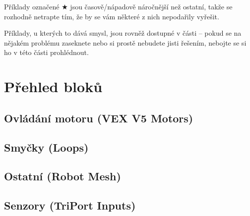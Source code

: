 Příklady označené $\bigstar$ jsou časově/nápadově náročnější než ostatní, takže se rozhodně netrapte tím, že by se vám některé z nich nepodařily vyřešit.

Příklady, u kterých to dává smysl, jsou rovněž dostupné v části  -- pokud se na nějakém problému zaseknete nebo si prostě nebudete jisti řešením, nebojte se si ho v této části prohlédnout.

\errata

\newpage

\setcounter{secnumdepth}{3}

\newpage

\newpage

\newpage

\newpage

\newpage

\newpage
\setcounter{secnumdepth}{0}

\newcommand{\where}[1]{{\normalfont (#1)}}

\section{Přehled bloků}

\subsection*{Ovládání motoru \where{VEX V5 Motors}}
\begin{itemize}
	\blockMotorStart
	\blockMotorStop
	\blockMotorDistance
	\blockMotorVelocity
\end{itemize}

\subsection*{Smyčky \where{Loops}}
\begin{itemize}
	\blockLoop
	\blockLoopForever
	\blockLoopWhile
\end{itemize}

\subsection*{Ostatní \where{Robot Mesh}}
\begin{itemize}
	\blockStart
	\blockMotorDone
	\blockWait
	\blockWaitUntil
	\blockComment
\end{itemize}

\subsection*{Senzory \where{TriPort Inputs}}
\begin{itemize}
	\blockBumperPressed
\end{itemize}

